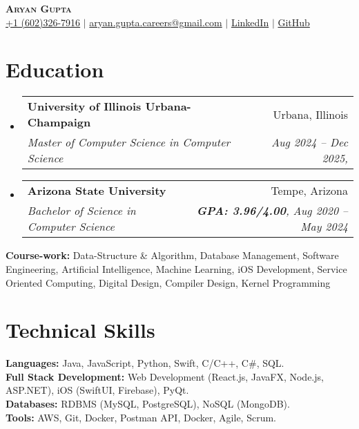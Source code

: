 \documentclass[letterpaper,11pt]{article}
\makeatletter
\newcommand{\resumeEducationHeading}[5]{
  \vspace{-2pt}\item
    \begin{tabular*}{0.97\textwidth}[t]{l@{\extracolsep{\fill}}r}
      \textbf{#1} & #2 \\
      \textit{\small#3} & \textit{\small #4, #5} \\
    \end{tabular*}\vspace{-5pt}
}
\newcommand{\resumeSubHeadingListStart}{\begin{itemize}[leftmargin=0.15in, label={}]}
\newcommand{\resumeSubHeadingListEnd}{\end{itemize}}
\makeatother
\begin{document}
\begin{center}
  \textbf{\Huge \scshape Aryan Gupta} \\ \vspace{3pt}
  \small
  \faMobile \hspace{.5pt} \href{tel:6023267916}{+1 (602)326-7916}
  $|$
  \faAt \hspace{.5pt} \href{mailto:aryan.gupta.careers@gmail.com}{aryan.gupta.careers@gmail.com}
  $|$
  \faLinkedinSquare \hspace{.5pt} \href{https://www.linkedin.com/in/agupt295}{LinkedIn}
  $|$
  \faGithub \hspace{.5pt} \href{https://github.com/agupt295}{GitHub}
\end{center}

\section{Education}
\resumeSubHeadingListStart
  \resumeEducationHeading
    {University of Illinois Urbana-Champaign}{Urbana, Illinois}
    {Master of Computer Science in Computer Science}{Aug 2024 -- Dec 2025}{}{}
\resumeSubHeadingListEnd
\vspace{-0.1cm} %
\resumeSubHeadingListStart
  \resumeEducationHeading
    {Arizona State University}{Tempe, Arizona}
    {Bachelor of Science in Computer Science}{\textbf{GPA: 3.96/4.00}}{Aug 2020 -- May 2024}{}
\resumeSubHeadingListEnd

  \resumeSubHeadingListStart
    \small{\item{
        \textbf{Course-work:}{ Data-Structure \& Algorithm, Database Management, Software Engineering, Artificial Intelligence, Machine Learning, iOS Development, Service Oriented Computing, Digital Design, Compiler Design, Kernel Programming} \\ \vspace{3pt}
    }}
  \resumeSubHeadingListEnd

\section{Technical Skills}
  \resumeSubHeadingListStart
    \small{\item{
      \textbf{Languages:}{ Java, JavaScript, Python, Swift, C/C++, C\#, SQL. } \\ \vspace{3pt}
      \textbf{Full Stack Development:}{ Web Development (React.js, JavaFX, Node.js, ASP.NET), iOS (SwiftUI, Firebase), PyQt. } \\ \vspace{3pt}
      \textbf{Databases:}{ RDBMS (MySQL, PostgreSQL), NoSQL (MongoDB). } \\ \vspace{3pt}
      \textbf{Tools:}{ AWS, Git, Docker, Postman API, Docker, Agile, Scrum. } \\ \vspace{3pt}
    }}
  \resumeSubHeadingListEnd
\end{document}
